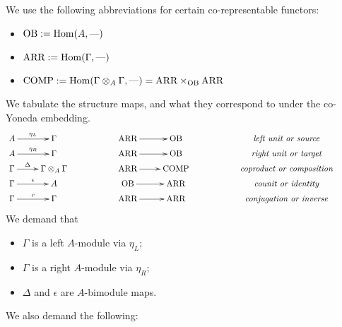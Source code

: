 \documentclass[11pt]{article}
\begin{document}
We use the following abbreviations for certain co-representable functors:
\begin{itemize}\squishlist
\item $\textup{OB}:=\operatorname{Hom}(A,\textup{---})$
\item $\textup{ARR}:=\operatorname{Hom}(\Gamma,\textup{---})$
\item $\textup{COMP}:=\operatorname{Hom}(\Gamma\otimes_A\Gamma,\textup{---})=\textup{ARR}\times_{\textup{OB}}\textup{ARR}$
\end{itemize}
We tabulate the structure maps, and what they correspond to under the co-Yoneda embedding.
\[\xymatrix@R=.1cm{
A\ar[r]^{\eta_L}&\Gamma&&\ARR\ar[r]&\OB&& \textit{left unit or source} \\
A\ar[r]^{\eta_R}&\Gamma&&\ARR\ar[r]&\OB&& \textit{right unit or target} \\
\Gamma\ar[r]^-{\Delta}&\Gamma\otimes_A\Gamma
&&\ARR\ar[r]&\COMP&&\textit{coproduct or composition} \\
\Gamma\ar[r]^{\epsilon}&A&&
\OB\ar[r]&\ARR&&\textit{counit or identity} \\
\Gamma\ar[r]^{c}&\Gamma&&
\ARR\ar[r]&\ARR&&\textit{conjugation or inverse} 
&
}\]
We demand that
\begin{itemize}\squishlist
\item $\Gamma$ is a left $A$-module via $\eta_L$;
\item $\Gamma$ is a right $A$-module via $\eta_R$;
\item $\Delta$ and $\epsilon$ are $A$-bimodule maps.
\end{itemize}
We also demand the following:
\end{document}
